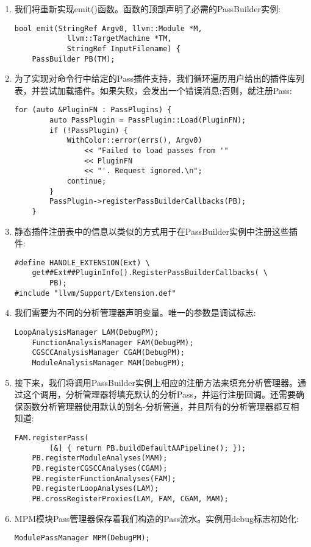 \begin{enumerate}
\item 我们将重新实现emit()函数。函数的顶部声明了必需的PassBuilder实例:
\begin{lstlisting}[caption={}]
bool emit(StringRef Argv0, llvm::Module *M,
			llvm::TargetMachine *TM,
			StringRef InputFilename) {
	PassBuilder PB(TM);
\end{lstlisting}

\item 为了实现对命令行中给定的Pass插件支持，我们循环遍历用户给出的插件库列表，并尝试加载插件。如果失败，会发出一个错误消息;否则，就注册Pass:
\begin{lstlisting}[caption={}]
	for (auto &PluginFN : PassPlugins) {
		auto PassPlugin = PassPlugin::Load(PluginFN);
		if (!PassPlugin) {
			WithColor::error(errs(), Argv0)
				<< "Failed to load passes from '" 
				<< PluginFN
				<< "'. Request ignored.\n";
			continue;
		}
		PassPlugin->registerPassBuilderCallbacks(PB);
	}
\end{lstlisting}

\item 静态插件注册表中的信息以类似的方式用于在PassBuilder实例中注册这些插件:
\begin{lstlisting}[caption={}]
#define HANDLE_EXTENSION(Ext) \
	get##Ext##PluginInfo().RegisterPassBuilderCallbacks( \
		PB);
#include "llvm/Support/Extension.def"
\end{lstlisting}

\item 我们需要为不同的分析管理器声明变量。唯一的参数是调试标志:
\begin{lstlisting}[caption={}]
	LoopAnalysisManager LAM(DebugPM);
	FunctionAnalysisManager FAM(DebugPM);
	CGSCCAnalysisManager CGAM(DebugPM);
	ModuleAnalysisManager MAM(DebugPM);
\end{lstlisting}

\item 接下来，我们将调用PassBuilder实例上相应的注册方法来填充分析管理器。通过这个调用，分析管理器将填充默认的分析Pass，并运行注册回调。还需要确保函数分析管理器使用默认的别名-分析管道，并且所有的分析管理器都互相知道:
\begin{lstlisting}[caption={}]
	FAM.registerPass(
		[&] { return PB.buildDefaultAAPipeline(); });
	PB.registerModuleAnalyses(MAM);
	PB.registerCGSCCAnalyses(CGAM);
	PB.registerFunctionAnalyses(FAM);
	PB.registerLoopAnalyses(LAM);
	PB.crossRegisterProxies(LAM, FAM, CGAM, MAM);
\end{lstlisting}

\item MPM模块Pass管理器保存着我们构造的Pass流水。实例用debug标志初始化:
\begin{lstlisting}[caption={}]
	ModulePassManager MPM(DebugPM);
\end{lstlisting}


\end{enumerate}
